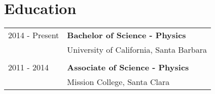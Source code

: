 \section*{Education}
\begin{tabular}{l l}
  2014 - Present & \textbf{Bachelor of Science - Physics} \\
  & University of California, Santa Barbara \\ \\
  2011 - 2014 & \textbf{Associate of Science - Physics} \\
  & Mission College, Santa Clara \\
\end{tabular}
